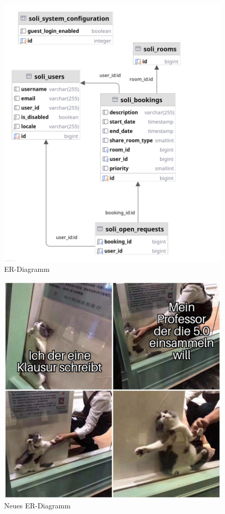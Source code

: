 \begin{figure}[ht]
    \centering
    \includegraphics[width=\textwidth]{figures/database}
    \caption{ER-Diagramm}
    \label{fig:er-diagramm}
\end{figure}

\begin{figure}[ht]
    \centering
    \includegraphics[width=\textwidth]{figures/impl-views/placeholder} %
    \caption{Neues ER-Diagramm}
    \label{fig:er-diagramm_new}
\end{figure}